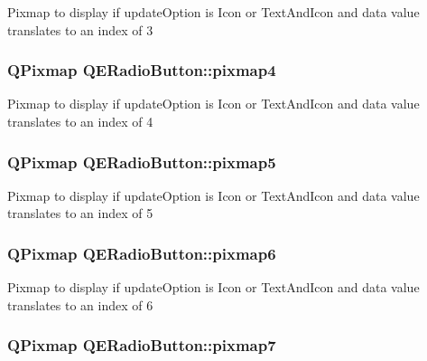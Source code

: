 Pixmap to display if updateOption is Icon or TextAndIcon and data value translates to an index of 3 \hypertarget{classQERadioButton_a76c94ee11cc9a49e8a62e4741e956d33}{
\subsubsection[{pixmap4}]{\setlength{\rightskip}{0pt plus 5cm}QPixmap QERadioButton::pixmap4}}
\label{classQERadioButton_a76c94ee11cc9a49e8a62e4741e956d33}
Pixmap to display if updateOption is Icon or TextAndIcon and data value translates to an index of 4 \hypertarget{classQERadioButton_a7774a3fe78c832be235cd896a0b3b050}{
\subsubsection[{pixmap5}]{\setlength{\rightskip}{0pt plus 5cm}QPixmap QERadioButton::pixmap5}}
\label{classQERadioButton_a7774a3fe78c832be235cd896a0b3b050}
Pixmap to display if updateOption is Icon or TextAndIcon and data value translates to an index of 5 \hypertarget{classQERadioButton_ab853c55e9253e0807aa264d3a631827c}{
\subsubsection[{pixmap6}]{\setlength{\rightskip}{0pt plus 5cm}QPixmap QERadioButton::pixmap6}}
\label{classQERadioButton_ab853c55e9253e0807aa264d3a631827c}
Pixmap to display if updateOption is Icon or TextAndIcon and data value translates to an index of 6 \hypertarget{classQERadioButton_aed4591af2dbf39278086d296f3e8db7e}{
\subsubsection[{pixmap7}]{\setlength{\rightskip}{0pt plus 5cm}QPixmap QERadioButton::pixmap7}}
